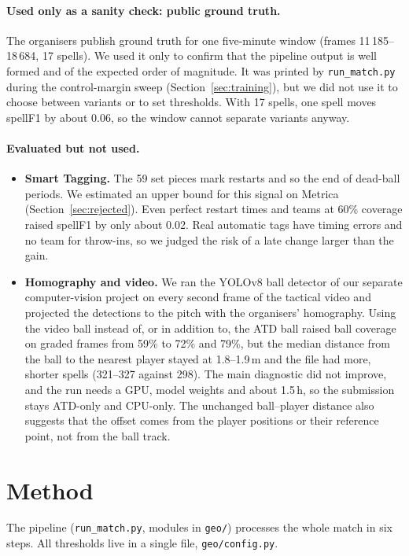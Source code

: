 \documentclass[11pt,a4paper]{article}
\newcommand{\code}[1]{\texttt{#1}}
\begin{document}
\paragraph{Used only as a sanity check: public ground truth.}
The organisers publish ground truth for one five-minute window (frames 11\,185--18\,684, 17 spells). We used it only
to confirm that the pipeline output is well formed and of the expected order of magnitude. It was printed by
\code{run\_match.py} during the control-margin sweep (Section~\ref{sec:training}), but we did not use it to choose
between variants or to set thresholds. With 17 spells, one spell moves spellF1 by about 0.06, so the window cannot
separate variants anyway.

\paragraph{Evaluated but not used.}
\begin{itemize}
  \item \textbf{Smart Tagging.} The 59 set pieces mark restarts and so the end of dead-ball periods. We estimated an
    upper bound for this signal on Metrica (Section~\ref{sec:rejected}). Even perfect restart times and teams at
    60\% coverage raised spellF1 by only about 0.02. Real automatic tags have timing errors and no team for throw-ins,
    so we judged the risk of a late change larger than the gain.
  \item \textbf{Homography and video.} We ran the YOLOv8 ball detector of our separate computer-vision project on every
    second frame of the tactical video and projected the detections to the pitch with the organisers' homography.
    Using the video ball instead of, or in addition to, the ATD ball raised ball coverage on graded frames from 59\%
    to 72\% and 79\%, but the median distance from the ball to the nearest player stayed at 1.8--1.9\,m and the file
    had more, shorter spells (321--327 against 298). The main diagnostic did not improve, and the run needs a GPU,
    model weights and about 1.5\,h, so the submission stays ATD-only and CPU-only. The unchanged ball--player distance
    also suggests that the offset comes from the player positions or their reference point, not from the ball track.
\end{itemize}

\section{Method}
The pipeline (\code{run\_match.py}, modules in \code{geo/}) processes the whole match in six steps. All thresholds
live in a single file, \code{geo/config.py}.
\end{document}
